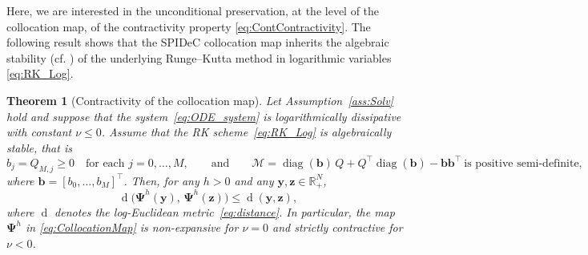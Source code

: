 \documentclass[a4paper,num-refs]{oup-contemporary-spidec}
\newtheorem{theorem}{Theorem}[section]
\begin{document}
Here, we are interested in the unconditional preservation, at the level of the collocation map, of the contractivity property \eqref{eq:ContContractivity}. The following result shows that the SPIDeC collocation map inherits the  algebraic stability (cf. \cite[Definition 357B]{Butcher}) of the underlying Runge--Kutta method in logarithmic variables \eqref{eq:RK_Log}. 
\begin{theorem}[Contractivity of the collocation map]
\label{thm:NonlinContr}
    Let Assumption~\ref{ass:Solv} hold and suppose that 
    the system~\eqref{eq:ODE_system} is logarithmically 
    dissipative with constant $\nu\leq 0$. Assume that 
    the RK scheme~\eqref{eq:RK_Log} is algebraically 
    stable, that is
    \begin{equation}\label{eq:Algebraic_Stability}
        b_j = Q_{M,j} \geq 0
        \quad \text{for each } j=0,\dots,M,
        \qquad \text{and} \qquad
        \bm{\mathcal{M}}
        = \operatorname{diag}(\bm{b})\,Q
          + Q^\top\operatorname{diag}(\bm{b})
          - \bm{b}\bm{b}^\top
        \ \text{is positive semi-definite,}
    \end{equation}
    where $\bm{b}=[b_0,\dots,b_M]^\top$.
    Then, for any $h>0$ and any 
    $\bm{y},\bm{z}\in\mathbb{R}_{+}^{N}$,
    \begin{equation}\label{eq:ContractColloc}
        \operatorname{d}\bigl(
          \bm{\Psi}^h(\bm{y}),\,
          \bm{\Psi}^h(\bm{z})
        \bigr)
        \leq \operatorname{d}(\bm{y},\bm{z}),
    \end{equation}
    where $\operatorname{d}$ denotes the log-Euclidean 
    metric~\eqref{eq:distance}. In particular, 
    the map $\bm{\Psi}^h$ in \eqref{eq:CollocationMap} is non-expansive for $\nu=0$ and 
    strictly contractive for $\nu<0$.
\end{theorem}
\end{document}
